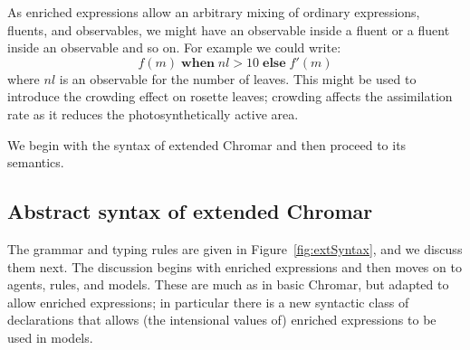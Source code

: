 As enriched expressions allow an arbitrary mixing of ordinary expressions,
fluents, and observables, we might have an observable inside a fluent or a
fluent inside an observable and so on. For example we could write:
\begin{equation*}
f(m) \; \mathbf{when} \; nl > 10 \; \mathbf{else} \; f'(m)
\end{equation*}
where $nl$ is an observable for the number of leaves. This might be used to
introduce the crowding effect on rosette leaves; crowding affects the
assimilation rate as it %
reduces the photosynthetically active area.

We begin with the syntax of extended Chromar and then proceed to its semantics.

\subsection{Abstract syntax of extended Chromar}
\label{sec:extSyntax}

The grammar and typing rules are given in Figure~\ref{fig:extSyntax}, and we
discuss them next. The discussion begins with enriched expressions and then
moves on to agents, rules, and models. These are much as in basic Chromar, but
adapted to allow enriched expressions; in particular there is a new syntactic
class of declarations that allows (the intensional values of) enriched
expressions to be used in models.

